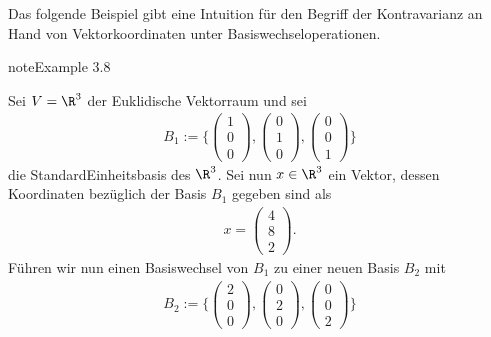 \documentclass[letterpaper,10pt,german]{jupyterBook}
\begin{document}
\sphinxAtStartPar
Das folgende Beispiel gibt eine Intuition für den Begriff der Kontravarianz an Hand von Vektorkoordinaten unter Basiswechseloperationen.
\label{vektoranalysis/tensor:example-21}
\begin{sphinxadmonition}{note}{Example 3.8}



\sphinxAtStartPar
Sei \(V = \R^3\) der Euklidische Vektorraum und sei
\begin{equation*}
\begin{split}B_1 := \lbrace \begin{pmatrix}1\\ 0\\ 0\end{pmatrix}, \begin{pmatrix}0\\ 1\\ 0\end{pmatrix}, \begin{pmatrix}0\\ 0\\ 1\end{pmatrix} \rbrace\end{split}
\end{equation*}
\sphinxAtStartPar
die Standard\sphinxhyphen{}Einheitsbasis des \(\R^3\).
Sei nun \(x \in \R^3\) ein Vektor, dessen Koordinaten bezüglich der Basis \(B_1\) gegeben sind als
\begin{equation*}
\begin{split}x = \begin{pmatrix}4\\ 8\\ 2\end{pmatrix}.\end{split}
\end{equation*}
\sphinxAtStartPar
Führen wir nun einen Basiswechsel von \(B_1\) zu einer neuen Basis \(B_2\) mit
\begin{equation*}
\begin{split}B_2 := \lbrace \begin{pmatrix}2\\ 0\\ 0\end{pmatrix}, \begin{pmatrix}0\\ 2\\ 0\end{pmatrix}, \begin{pmatrix}0\\ 0\\ 2\end{pmatrix} \rbrace\end{split}

\end{equation*}
\end{sphinxadmonition}
\end{document}
